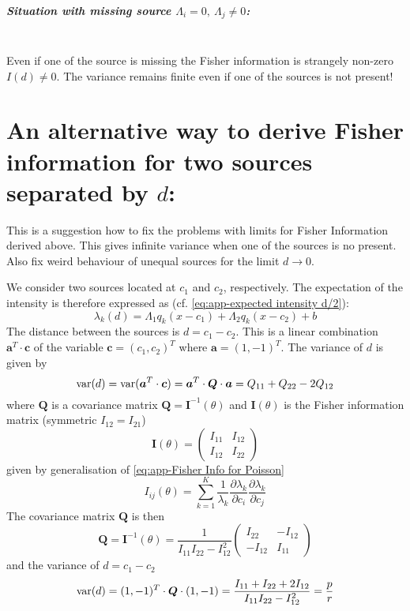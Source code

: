\subparagraph*{Situation with missing source $\Lambda_i=0,\ \Lambda_j\neq0$:}\ \\
Even if one of the source is missing the Fisher information is strangely non-zero $I(d)\neq0$. The variance remains finite even if one of the sources is not present!


\section{An alternative way to derive Fisher information for two sources separated by $d$:}
\label{sec:Appendix FI alternative}
This is a suggestion how to fix the problems with limits for Fisher Information derived above. This gives infinite variance when one of the sources is no present. Also fix weird behaviour of unequal sources for the limit $d\rightarrow0$. 

We consider two sources located at $c_1$ and $c_2$, respectively. The expectation of the intensity is therefore expressed as (cf. \autoref{eq:app-expected intensity d/2}):
%
\begin{equation}
	\lambda_k(d)=\Lambda_1q_k(x-c_1)+\Lambda_2q_k(x-c_2)+b
	\label{eq:app-Expected intensity c_1 c_2}
\end{equation}
%
The distance between the sources is $d=c_1-c_2$. This is a linear combination $\bm{a}^T\cdot\bm{c}$ of the variable $\bm{c}=(c_1,c_2)^T$ where $\bm{a}=(1,-1)^T$. The variance of $d$ is given by 
%
\begin{equation}
	\mathrm{var}(d)=\mathrm{var}(\bm{a}^T\cdot\bm{c})=\bm{a}^T\cdot\bm{Q}\cdot\bm{a}=Q_{11}+Q_{22}-2Q_{12}
\end{equation}
%
where $\bm{Q}$ is a covariance matrix $\bm{Q}=\bm{I}^{-1}(\theta)$ and $\bm{I}(\theta)$ is the Fisher information matrix (symmetric
$I_{12}=I_{21}$)
%
\begin{equation}
	\bm{I}(\theta)=\left(
	\begin{array}{cc}
		I_{11} & I_{12}\\
		I_{12} & I_{22}
	\end{array}\right)
\end{equation}
%
given by generalisation of \autoref{eq:app-Fisher Info for Poisson}
%
\begin{equation}
	I_{ij}(\theta)=\sum_{k=1}^K\frac{1}{\lambda_k}\frac{\partial\lambda_k}{\partial c_i}\frac{\partial\lambda_k}{\partial c_j}
	\label{eq:app-Fisher Info general lambda}
\end{equation}
%
The covariance matrix $\bm{Q}$ is then 
%
\begin{equation}
	\bm{Q}=\bm{I}^{-1}(\theta)=\frac{1}{I_{11}I_{22}-I_{12}^2}\left(
	\begin{array}{cc}
		I_{22} & -I_{12}\\
		-I_{12} & I_{11}
	\end{array}\right)
\end{equation}
%
and the variance of $d=c_1-c_2$ 
%
\begin{equation}
	\mathrm{var}(d)=(1,-1)^T\cdot\bm{Q}\cdot(1,-1)=\frac{I_{11}+I_{22}+2I_{12}}{I_{11}I_{22}-I_{12}^2}=\frac{p}{r}
	\label{eq:app-variance alternative}
\end{equation}


